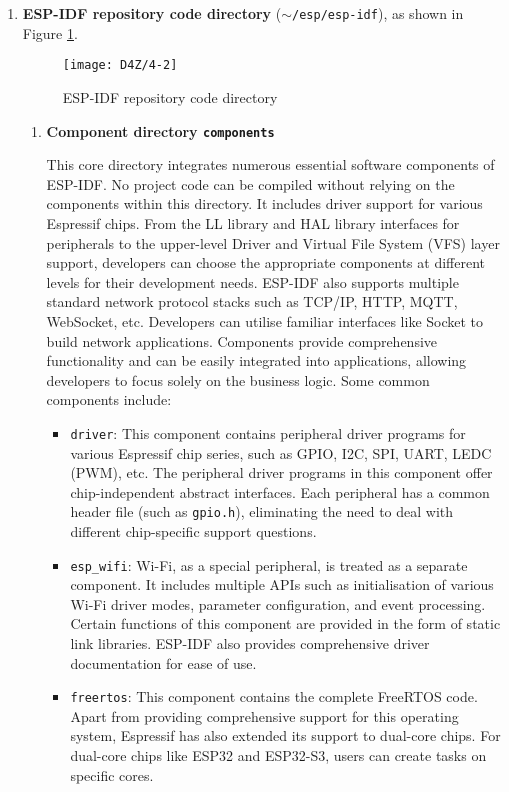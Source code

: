 \documentclass[a4paper,12pt]{book}
\begin{document}
\begin{enumerate}[label=(\arabic*),leftmargin=2em]
    \item \textbf{ESP-IDF repository code directory} (\texttt{$\sim$/esp/esp-idf}), as shown in Figure \ref{ESP-IDF repository code directory}.

    \begin{figure}[h!]
        \centering
        \texttt{[image: D4Z/4-2]}
        \caption{ESP-IDF repository code directory}
        \label{ESP-IDF repository code directory}
    \end{figure}

    \begin{enumerate}[label=\textbf{\alph*.},leftmargin=0em]
        \item \textbf{Component directory \texttt{components}}

        This core directory integrates numerous essential software components of ESP-IDF. No project code can be compiled without relying on the components within this directory. It includes driver support for various Espressif chips. From the LL library and HAL library interfaces for peripherals to the upper-level Driver and Virtual File System (VFS) layer support, developers can choose the appropriate components at different levels for their development needs. ESP-IDF also supports multiple standard network protocol stacks such as TCP/IP, HTTP, MQTT, WebSocket, etc. Developers can utilise familiar interfaces like Socket to build network applications. Components provide comprehensive functionality and can be easily integrated into applications, allowing developers to focus solely on the business logic. Some common components include:

        \begin{itemize}[leftmargin=1em]
            \item \verb|driver|: This component contains peripheral driver programs for various Espressif chip series, such as GPIO, I2C, SPI, UART, LEDC (PWM), etc. The peripheral driver programs in this component offer chip-independent abstract interfaces. Each peripheral has a common header file (such as \verb|gpio.h|), eliminating the need to deal with different chip-specific support questions.
            \item \verb|esp_wifi|: Wi-Fi, as a special peripheral, is treated as a separate component. It includes multiple APIs such as initialisation of various Wi-Fi driver modes, parameter configuration, and event processing. Certain functions of this component are provided in the form of static link libraries. ESP-IDF also provides comprehensive driver documentation for ease of use.
            \item \verb|freertos|: This component contains the complete FreeRTOS code. Apart from providing comprehensive support for this operating system, Espressif has also extended its support to dual-core chips. For dual-core chips like ESP32 and ESP32-S3, users can create tasks on specific cores.
        \end{itemize}


\end{enumerate}
\end{enumerate}
\end{document}
